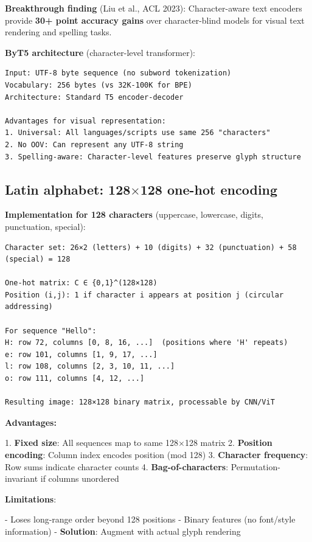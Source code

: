 \documentclass[11pt]{article}
\begin{document}
\textbf{Breakthrough finding} (Liu et al., ACL 2023): Character-aware text encoders provide \textbf{30+ point accuracy gains} over character-blind models for visual text rendering and spelling tasks.

\textbf{ByT5 architecture} (character-level transformer):

\begin{verbatim}
Input: UTF-8 byte sequence (no subword tokenization)
Vocabulary: 256 bytes (vs 32K-100K for BPE)
Architecture: Standard T5 encoder-decoder

Advantages for visual representation:
1. Universal: All languages/scripts use same 256 "characters"
2. No OOV: Can represent any UTF-8 string
3. Spelling-aware: Character-level features preserve glyph structure
\end{verbatim}

\subsection{Latin alphabet: 128\(\times\)128 one-hot encoding}

\textbf{Implementation for 128 characters} (uppercase, lowercase, digits, punctuation, special):

\begin{verbatim}
Character set: 26×2 (letters) + 10 (digits) + 32 (punctuation) + 58 (special) = 128

One-hot matrix: C ∈ {0,1}^(128×128)
Position (i,j): 1 if character i appears at position j (circular addressing)

For sequence "Hello":
H: row 72, columns [0, 8, 16, ...]  (positions where 'H' repeats)
e: row 101, columns [1, 9, 17, ...]
l: row 108, columns [2, 3, 10, 11, ...]
o: row 111, columns [4, 12, ...]

Resulting image: 128×128 binary matrix, processable by CNN/ViT
\end{verbatim}

\textbf{Advantages:}

1. \textbf{Fixed size}: All sequences map to same 128\(\times\)128 matrix
2. \textbf{Position encoding}: Column index encodes position (mod 128)
3. \textbf{Character frequency}: Row sums indicate character counts
4. \textbf{Bag-of-characters}: Permutation-invariant if columns unordered

\textbf{Limitations}:

- Loses long-range order beyond 128 positions
- Binary features (no font/style information)
- \textbf{Solution}: Augment with actual glyph rendering
\end{document}
